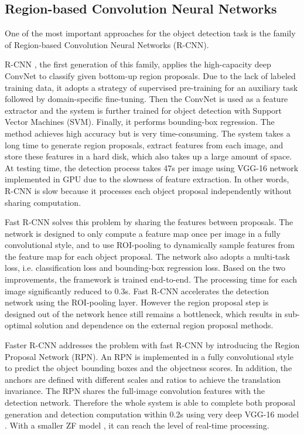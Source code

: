 \documentclass[10pt,journal,cspaper,compsoc]{IEEEtran}
\begin{document}
\subsection{Region-based Convolution Neural Networks}
One of the most important approaches for the object detection task is the family of Region-based Convolution Neural Networks (R-CNN). 

R-CNN \cite{girshick2016region}, the first generation of this family, applies the high-capacity deep ConvNet to classify given bottom-up region proposals. Due to the lack of labeled training data, it adopts a strategy of supervised pre-training for an auxiliary task followed by domain-specific fine-tuning. Then the ConvNet is used as a feature extractor and the system is further trained for object detection with Support Vector Machines (SVM). Finally, it performs bounding-box regression. The method achieves high accuracy but is very time-consuming. The system takes a long time to generate region proposals, extract features from each image, and store these features in a hard disk, which also takes up a large amount of space. At testing time, the detection process takes 47s per image using VGG-16 network \cite{simonyan2014very} implemented in GPU due to the slowness of feature extraction. In other words, R-CNN is slow because it processes each object proposal independently without sharing computation. 

Fast R-CNN \cite{girshick2015fast} solves this problem by sharing the features between proposals. The network is designed to only compute a feature map once per image in a fully convolutional style, and to use ROI-pooling to dynamically sample features from the feature map for each object proposal. The network also adopts a multi-task loss, i.e. classification loss and bounding-box regression loss. Based on the two improvements, the framework is trained end-to-end. The processing time for each image significantly reduced to 0.3s. Fast R-CNN accelerates the detection network using the ROI-pooling layer. However the region proposal step is designed out of the network hence still remains a bottleneck, which results in sub-optimal solution and dependence on the external region proposal methods. 

Faster R-CNN \cite{ren2015faster} addresses the problem with fast R-CNN by introducing the Region Proposal Network (RPN). An RPN is implemented in a fully convolutional style to predict the object bounding boxes and the objectness scores. In addition, the anchors are defined with different scales and ratios to achieve the translation invariance. The RPN shares the full-image convolution features with the detection network. Therefore the whole system is able to complete both proposal generation and detection computation within 0.2s using very deep VGG-16 model \cite{simonyan2014very}. With a smaller ZF model \cite{zeiler2014visualizing}, it can reach the level of real-time processing.
\end{document}
